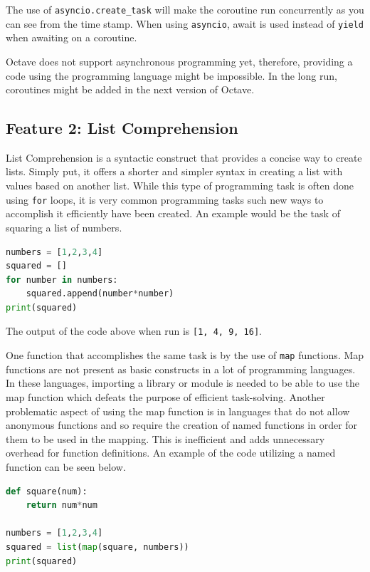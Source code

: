 \documentclass{article}
\begin{document}
\par
The use of \texttt{asyncio.create\_task} will make the coroutine run concurrently as you can see from the time stamp. When using \texttt{asyncio}, await is used instead of \texttt{yield} when awaiting on a coroutine.

\par
Octave does not support asynchronous programming yet, therefore, providing a code using the programming language might be impossible. In the long run, coroutines might be added in the next version of Octave.

\subsection*{Feature 2: List Comprehension}
\par
List Comprehension is a syntactic construct that provides a concise way to create lists. Simply put, it offers a shorter and simpler syntax in creating a list with values based on another list. While this type of programming task is often done using \texttt{for} loops, it is very common programming tasks such new ways to accomplish it efficiently have been created. An example would be the task of squaring a list of numbers.

\begin{lstlisting}[language=Python]
numbers = [1,2,3,4]
squared = []
for number in numbers:
    squared.append(number*number)
print(squared)
\end{lstlisting}

\par
The output of the code above when run is \texttt{[1, 4, 9, 16]}.
\par
One function that accomplishes the same task is by the use of \texttt{map} functions. Map functions are not present as basic constructs in a lot of programming languages. In these languages, importing a library or module is needed to be able to use the map function which defeats the purpose of efficient task-solving. Another problematic aspect of using the map function is in languages that do not allow anonymous functions and so require the creation of named functions in order for them to be used in the mapping. This is inefficient and adds unnecessary overhead for function definitions. An example of the code utilizing a named function can be seen below.

\begin{lstlisting}[language=Python]
def square(num):
    return num*num

numbers = [1,2,3,4]
squared = list(map(square, numbers))
print(squared)
\end{lstlisting}
\end{document}

